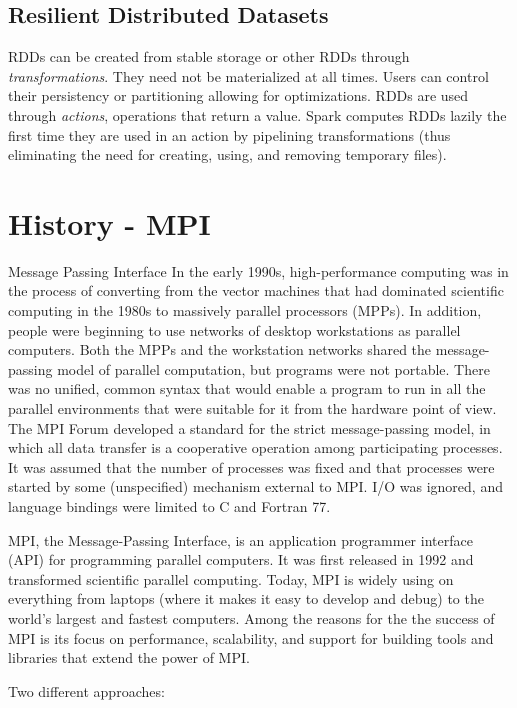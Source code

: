 \documentclass[letterpaper,twocolumn,10pt]{article}
\begin{document}
\subsection{Resilient Distributed Datasets}
RDDs can be created from stable storage or other RDDs through \textit{transformations}. They need not be materialized at all times. Users can control their persistency or partitioning allowing for optimizations. RDDs are used through \textit{actions}, operations that return a value. Spark computes RDDs lazily the first time they are used in an action by pipelining transformations (thus eliminating the need for creating, using, and removing temporary files).




\section{History - MPI}
Message Passing Interface
In the early 1990s, high-performance computing was in the process of converting from the vector machines that had dominated scientific computing in the 1980s to massively parallel processors (MPPs).
In addition, people were beginning to use networks of desktop workstations as parallel computers. Both the MPPs and the workstation networks shared the message-passing model of parallel computation, but programs were not portable.
There was no unified, common syntax that would enable a program to run in all the parallel environments that were suitable for it from the hardware point of view.
The MPI Forum developed a standard for the strict message-passing model, in which all data transfer is a cooperative operation among participating processes. It was assumed that the number of processes was fixed and that processes were started by some (unspecified) mechanism external to MPI.
I/O was ignored, and language bindings were limited to C and Fortran 77.

MPI, the Message-Passing Interface, is an application programmer interface (API) for programming parallel computers. It was first released in 1992 and transformed scientific parallel computing. Today, MPI is widely using on everything from laptops (where it makes it easy to develop and debug) to the world's largest and fastest computers. Among the reasons for the the success of MPI is its focus on performance, scalability, and support for building tools and libraries that extend the power of MPI.

Two different approaches:
\end{document}
